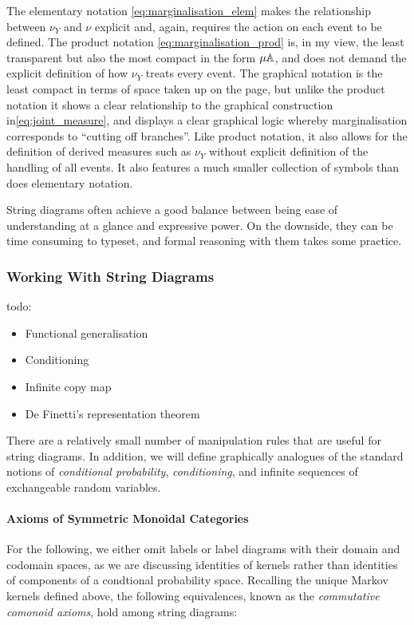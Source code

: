 The elementary notation \ref{eq:marginalisation_elem} makes the relationship between $\nu_Y$ and $\nu$ explicit and, again, requires the action on each event to be defined. The product notation \ref{eq:marginalisation_prod} is, in my view, the least transparent but also the most compact in the form $\mu \mathbb{A}$, and does not demand the explicit definition of how $\nu_Y$ treats every event. The graphical notation is the least compact in terms of space taken up on the page, but unlike the product notation it shows a clear relationship to the graphical construction in\ref{eq:joint_measure}, and displays a clear graphical logic whereby marginalisation corresponds to ``cutting off branches''. Like product notation, it also allows for the definition of derived measures such as $\nu_Y$ without explicit definition of the handling of all events. It also features a much smaller collection of symbols than does elementary notation.

String diagrams often achieve a good balance between being ease of understanding at a glance and expressive power. On the downside, they can be time consuming to typeset, and formal reasoning with them takes some practice.

\subsubsection{Working With String Diagrams}\label{sssec:string_diagram_manipulation}

todo:
\begin{itemize}
\item Functional generalisation
\item Conditioning
\item Infinite copy map
\item De Finetti's representation theorem
\end{itemize}

There are a relatively small number of manipulation rules that are useful for string diagrams. In addition, we will define graphically analogues of the standard notions of \emph{conditional probability}, \emph{conditioning}, and infinite sequences of exchangeable random variables.

\paragraph{Axioms of Symmetric Monoidal Categories}

For the following, we either omit labels or label diagrams with their domain and codomain spaces, as we are discussing identities of kernels rather than identities of components of a condtional probability space. Recalling the unique Markov kernels defined above, the following equivalences, known as the \emph{commutative comonoid axioms}, hold among string diagrams:

